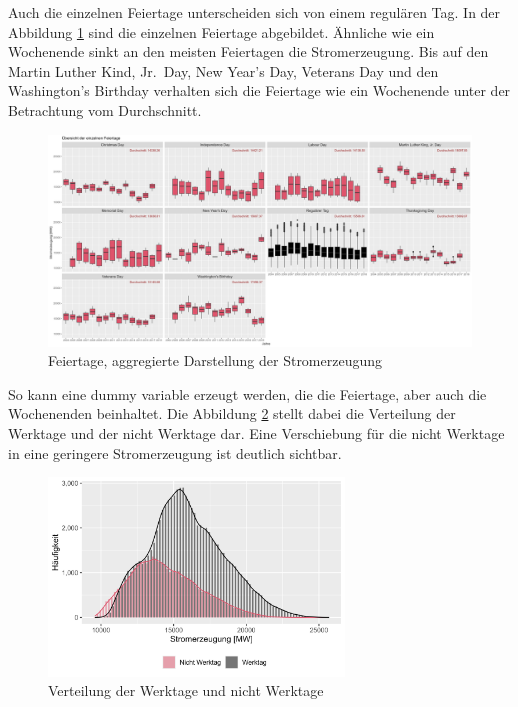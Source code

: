 \documentclass[11pt,ngerman,a4paper,]{article}
\begin{document}
Auch die einzelnen Feiertage unterscheiden sich von einem regulären Tag. In der Abbildung \ref{fig:holiday_boxplot} sind die einzelnen Feiertage abgebildet. Ähnliche wie ein Wochenende sinkt an den meisten Feiertagen die Stromerzeugung. Bis auf den Martin Luther Kind, Jr.~Day, New Year's Day, Veterans Day und den Washington's Birthday verhalten sich die Feiertage wie ein Wochenende unter der Betrachtung vom Durchschnitt.

\begin{figure}[H]
\centering
\includegraphics[width=1.0\textwidth]{plots/holiday_boxplot}
\caption{Feiertage, aggregierte Darstellung der Stromerzeugung}
\label{fig:holiday_boxplot}
\end{figure}

So kann eine dummy variable erzeugt werden, die die Feiertage, aber auch die Wochenenden beinhaltet. Die Abbildung \ref{fig:workday_histogram} stellt dabei die Verteilung der Werktage und der nicht Werktage dar. Eine Verschiebung für die nicht Werktage in eine geringere Stromerzeugung ist deutlich sichtbar.

\begin{figure}[H]
\centering
\includegraphics[width=0.7\textwidth]{plots/workday_histogram}
\caption{Verteilung der Werktage und nicht Werktage}
\label{fig:workday_histogram}
\end{figure}
\end{document}
